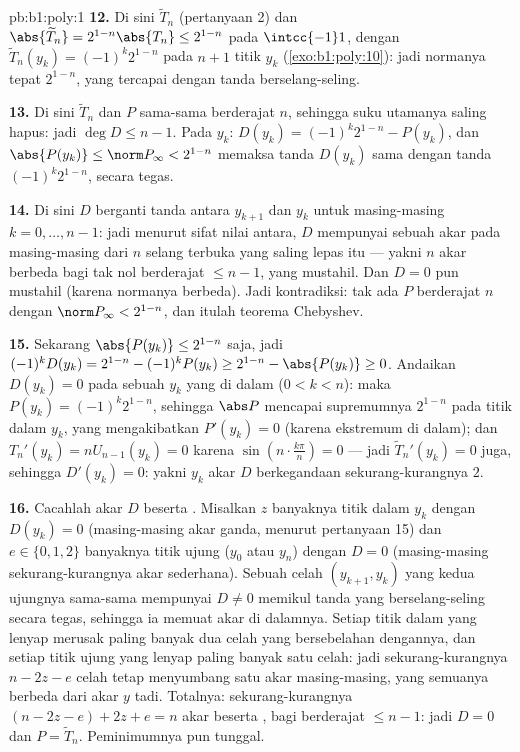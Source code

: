 \begin{solution}{pb:b1:poly:1}
\textbf{12.} Di sini $\widetilde T_n$  (pertanyaan 2) dan
$\abs{\widetilde T_n} = 2^{1-n}\abs{T_n} \leq 2^{1-n}$ pada
$\intcc{-1}1$, dengan $\widetilde T_n(y_k) = (-1)^k2^{1-n}$ pada
$n + 1$ titik $y_k$ (\cref{exo:b1:poly:10}): jadi normanya tepat
$2^{1-n}$, yang tercapai dengan tanda berselang-seling.

\textbf{13.} Di sini $\widetilde T_n$ dan $P$ sama-sama  berderajat
$n$, sehingga suku utamanya saling hapus: jadi $\deg D \leq n - 1$. Pada $y_k$:
$D(y_k) = (-1)^k2^{1-n} - P(y_k)$, dan $\abs{P(y_k)} \leq \norm
P_\infty < 2^{1-n}$ memaksa tanda $D(y_k)$ sama dengan tanda
$(-1)^k2^{1-n}$, secara tegas.

\textbf{14.} Di sini $D$ berganti tanda antara $y_{k+1}$ dan $y_k$ untuk masing-masing
$k = 0, \dots, n-1$: jadi menurut sifat nilai antara, $D$ mempunyai
sebuah akar pada masing-masing dari $n$ selang terbuka yang saling lepas itu --- yakni $n$
akar berbeda bagi  tak nol berderajat $\leq n - 1$,
yang mustahil. Dan $D = 0$ pun mustahil (karena normanya berbeda).
Jadi kontradiksi: tak ada $P$  berderajat $n$ dengan $\norm P_\infty <
2^{1-n}$, dan itulah teorema Chebyshev.

\textbf{15.} Sekarang $\abs{P(y_k)} \leq 2^{1-n}$ saja, jadi $(-1)^k
D(y_k) = 2^{1-n} - (-1)^kP(y_k) \geq 2^{1-n} - \abs{P(y_k)} \geq
0$. Andaikan $D(y_k) = 0$ pada sebuah $y_k$ yang di dalam ($0 < k < n$): maka
$P(y_k) = (-1)^k2^{1-n}$, sehingga $\abs P$ mencapai supremumnya
$2^{1-n}$ pada titik dalam $y_k$, yang mengakibatkan $P'(y_k) = 0$
(karena ekstremum di dalam); dan $T_n'(y_k) = nU_{n-1}(y_k) = 0$ karena
$\sin(n\cdot\frac{k\pi}n) = 0$ --- jadi $\widetilde T_n'(y_k) = 0$
juga, sehingga $D'(y_k) = 0$: yakni $y_k$ akar $D$ berkegandaan
sekurang-kurangnya $2$.

\textbf{16.} Cacahlah akar $D$ beserta . Misalkan $z$
banyaknya titik dalam $y_k$ dengan $D(y_k) = 0$ (masing-masing akar
ganda, menurut pertanyaan 15) dan $e \in \{0, 1, 2\}$ banyaknya
titik ujung ($y_0$ atau $y_n$) dengan $D = 0$ (masing-masing sekurang-kurangnya akar
sederhana). Sebuah celah $(y_{k+1}, y_k)$ yang kedua ujungnya sama-sama mempunyai $D
\neq 0$ memikul tanda yang berselang-seling secara tegas, sehingga ia memuat
akar di dalamnya. Setiap titik dalam yang lenyap merusak paling banyak dua
celah yang bersebelahan dengannya, dan setiap titik ujung yang lenyap paling banyak satu celah: jadi sekurang-kurangnya
$n - 2z - e$ celah tetap menyumbang satu akar masing-masing, yang semuanya berbeda
dari akar $y$ tadi. Totalnya: sekurang-kurangnya $(n - 2z - e) + 2z + e = n$
akar beserta , bagi  berderajat $\leq n - 1$:
jadi $D = 0$ dan $P = \widetilde T_n$. Peminimumnya pun tunggal.


\end{solution}

